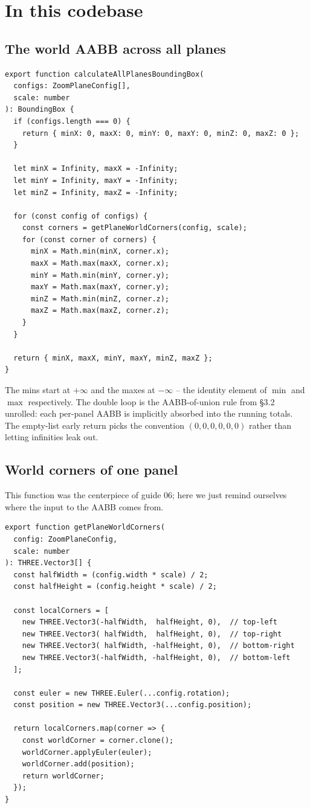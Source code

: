 \documentclass{article}
\begin{document}
\section{In this codebase}

\subsection{The world AABB across all planes}

\begin{lstlisting}
export function calculateAllPlanesBoundingBox(
  configs: ZoomPlaneConfig[],
  scale: number
): BoundingBox {
  if (configs.length === 0) {
    return { minX: 0, maxX: 0, minY: 0, maxY: 0, minZ: 0, maxZ: 0 };
  }

  let minX = Infinity, maxX = -Infinity;
  let minY = Infinity, maxY = -Infinity;
  let minZ = Infinity, maxZ = -Infinity;

  for (const config of configs) {
    const corners = getPlaneWorldCorners(config, scale);
    for (const corner of corners) {
      minX = Math.min(minX, corner.x);
      maxX = Math.max(maxX, corner.x);
      minY = Math.min(minY, corner.y);
      maxY = Math.max(maxY, corner.y);
      minZ = Math.min(minZ, corner.z);
      maxZ = Math.max(maxZ, corner.z);
    }
  }

  return { minX, maxX, minY, maxY, minZ, maxZ };
}
\end{lstlisting}

The mins start at $+\infty$ and the maxes at $-\infty$ -- the identity element of
$\min$ and $\max$ respectively. The double loop is the AABB-of-union rule from
\S 3.2 unrolled: each per-panel AABB is implicitly absorbed into the running totals.
The empty-list early return picks the convention $(0,0,0,0,0,0)$ rather than letting
infinities leak out.

\subsection{World corners of one panel}

This function was the centerpiece of guide 06; here we just remind ourselves where the
input to the AABB comes from.

\begin{lstlisting}
export function getPlaneWorldCorners(
  config: ZoomPlaneConfig,
  scale: number
): THREE.Vector3[] {
  const halfWidth = (config.width * scale) / 2;
  const halfHeight = (config.height * scale) / 2;

  const localCorners = [
    new THREE.Vector3(-halfWidth,  halfHeight, 0),  // top-left
    new THREE.Vector3( halfWidth,  halfHeight, 0),  // top-right
    new THREE.Vector3( halfWidth, -halfHeight, 0),  // bottom-right
    new THREE.Vector3(-halfWidth, -halfHeight, 0),  // bottom-left
  ];

  const euler = new THREE.Euler(...config.rotation);
  const position = new THREE.Vector3(...config.position);

  return localCorners.map(corner => {
    const worldCorner = corner.clone();
    worldCorner.applyEuler(euler);
    worldCorner.add(position);
    return worldCorner;
  });
}
\end{lstlisting}
\end{document}
